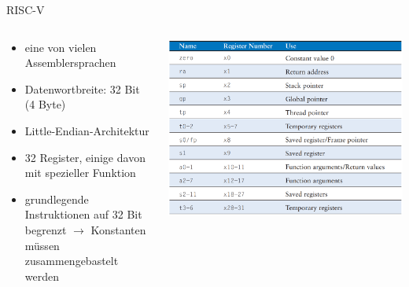 \documentclass[
  german,            %
  aspectratio=169,    %
]{tumbeamer}
\begin{document}
\begin{frame}[c]{RISC-V}{}
  \begin{columns}[c]
    \begin{column}{0.5\textwidth}
      \begin{itemize}
        \item eine von vielen Assemblersprachen
        \item Datenwortbreite: 32 Bit (4 Byte)
        \item Little-Endian-Architektur
        \item 32 Register, einige davon mit spezieller Funktion
        \item grundlegende Instruktionen auf 32 Bit begrenzt 
        $\rightarrow$ Konstanten müssen zusammengebastelt werden
      \end{itemize}
    \end{column}
    \begin{column}{0.5\textwidth}
      \includegraphics[width=\linewidth]{riscv_registers.png}
    \end{column}
  \end{columns}
\end{frame}
\end{document}
